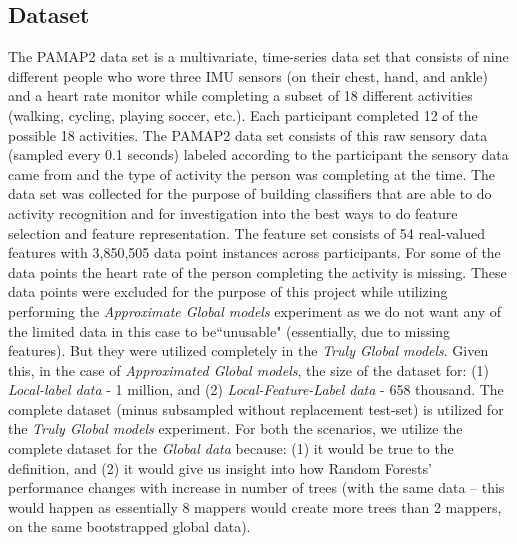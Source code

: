 \documentclass{sig-alternate-05-2015}
\begin{document}
\subsection{Dataset}
The PAMAP2 data set is a multivariate, time-series data set that consists of nine different people who wore three IMU sensors (on their chest, hand, and ankle) and a heart rate monitor while completing a subset of 18 different activities (walking, cycling, playing soccer, etc.). Each participant completed 12 of the possible 18 activities. The PAMAP2 data set consists of this raw sensory data (sampled every 0.1 seconds) labeled according to the participant the sensory data came from and the type of activity the person was completing at the time. The data set was collected for the purpose of building classifiers that are able to do activity recognition and for investigation into the best ways to do feature selection and feature representation. The feature set consists of 54 real-valued features with 3,850,505 data point instances across participants. For some of the data points the heart rate of the person completing the activity is missing. These data points were excluded for the purpose of this project while utilizing performing the \textit{Approximate Global models} experiment as we do not want any of the limited data in this case to be``unusable" (essentially, due to missing features). But they were utilized completely in the \textit{Truly Global models}. Given this, in the case of \textit{Approximated Global models}, the size of the dataset for: (1) \textit{Local-label data} - 1 million, and (2) \textit{Local-Feature-Label data} - 658 thousand. The complete dataset (minus subsampled without replacement test-set) is utilized for the \textit{Truly Global models} experiment. For both the scenarios, we utilize the complete dataset for the \textit{Global data} because: (1) it would be true to the definition, and (2) it would give us insight into how Random Forests' performance changes with increase in number of trees (with the same data -- this would happen as essentially 8 mappers would create more trees than 2 mappers, on the same bootstrapped global data).
\end{document}
